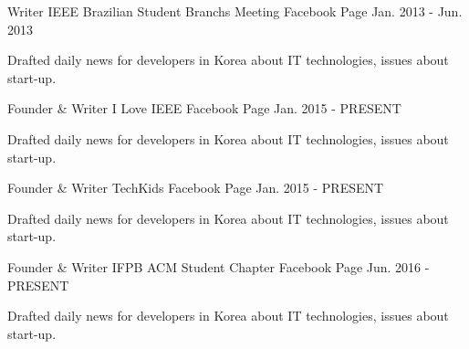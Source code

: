 

\begin{cventries}

  \cventry
    {Writer} %
    {IEEE Brazilian Student Branchs Meeting} %
    {Facebook Page} %
    {Jan. 2013 - Jun. 2013} %
    {
      \begin{cvitems} %
        \item {Drafted daily news for developers in Korea about IT technologies, issues about start-up.}
      \end{cvitems}
    }
    
  \cventry
    {Founder \& Writer} %
    {I Love IEEE} %
    {Facebook Page} %
    {Jan. 2015 - PRESENT} %
    {
      \begin{cvitems} %
        \item {Drafted daily news for developers in Korea about IT technologies, issues about start-up.}
      \end{cvitems}
    }
    
  \cventry
    {Founder \& Writer} %
    {TechKids} %
    {Facebook Page} %
    {Jan. 2015 - PRESENT} %
    {
      \begin{cvitems} %
        \item {Drafted daily news for developers in Korea about IT technologies, issues about start-up.}
      \end{cvitems}
    }
    
  \cventry
    {Founder \& Writer} %
    {IFPB ACM Student Chapter} %
    {Facebook Page} %
    {Jun. 2016 - PRESENT} %
    {
      \begin{cvitems} %
        \item {Drafted daily news for developers in Korea about IT technologies, issues about start-up.}
      \end{cvitems}
    }
    

\end{cventries}

